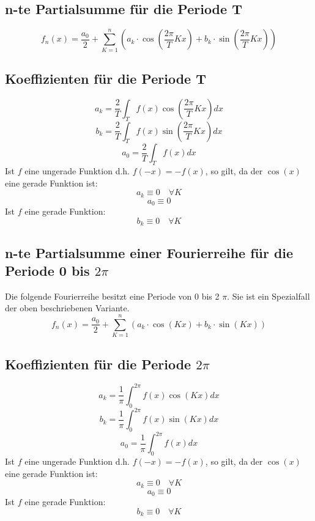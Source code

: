 \subsection{n-te Partialsumme für die Periode T}\label{subsec:fouriert}
\[ \boxed{f_n(x) = \frac{a_0}{2} + \sum_{K=1}^n \left(a_k \cdot \cos \left(\frac{2 \pi}{T} K x\right) + b_k \cdot \sin\left(\frac{2 \pi}{T} K x\right)\right)} \]

\subsection{Koeffizienten für die Periode T}
\[ \boxed{a_k = \frac{2}{T} \int_T f(x) \cos(\frac{2 \pi}{T} K x) dx} \]
\[ \boxed{b_k = \frac{2}{T} \int_T f(x) \sin(\frac{2 \pi}{T} K x) dx} \]
\[ \boxed{a_0 = \frac{2}{T} \int_T f(x) dx
} \]
Ist $f$ eine ungerade Funktion d.h. $f(-x) = -f(x)$, so gilt, da der $\cos(x)$ eine gerade Funktion ist: 
\[ a_k \equiv 0 \quad \forall K\]
\[ a_0 \equiv 0 \]
Ist $f$ eine gerade Funktion: 
\[ b_k \equiv 0 \quad \forall K \]

\subsection{n-te Partialsumme einer Fourierreihe für die Periode 0 bis $2\pi$}\label{subsec:fourierpi}
Die folgende Fourierreihe besitzt eine Periode von 0 bis 2 $\pi$.
Sie ist ein Spezialfall der oben beschriebenen Variante.
\[ \boxed{f_n(x) = \frac{a_0}{2} + \sum_{K=1}^n \left(a_k \cdot \cos(Kx) + b_k \cdot \sin(Kx)\right)} \]

\subsection{Koeffizienten für die Periode $2\pi$}
\[ \boxed{a_k = \frac{1}{\pi} \int_0^{2 \pi} f(x) \cos(K x) dx} \]
\[ \boxed{b_k = \frac{1}{\pi} \int_0^{2 \pi} f(x) \sin(K x) dx} \]
\[ \boxed{a_0 = \frac{1}{\pi} \int_0^{2 \pi} f(x) dx
} \]
Ist $f$ eine ungerade Funktion d.h. $f(-x) = -f(x)$, so gilt, da der $\cos(x)$ eine gerade Funktion ist: 
\[ a_k \equiv 0 \quad \forall K\]
\[ a_0 \equiv 0 \]
Ist $f$ eine gerade Funktion: 
\[ b_k \equiv 0 \quad \forall K \]

